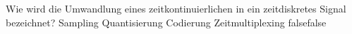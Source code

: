     {Wie wird die Umwandlung eines zeitkontinuierlichen in ein zeitdiskretes Signal bezeichnet?}
    {Sampling}
    {Quantisierung}
    {Codierung}
    {Zeitmultiplexing}
    {false}{false}